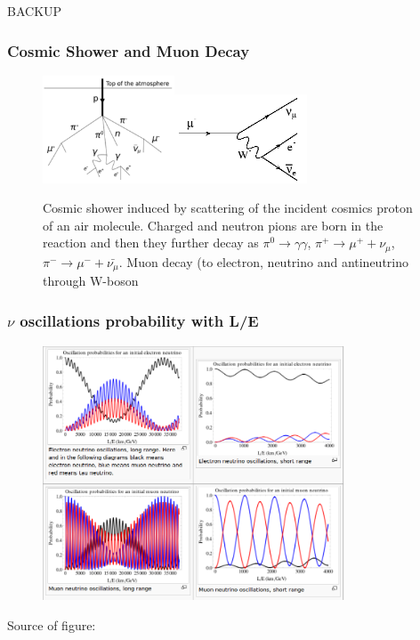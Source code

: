 \begin{frame}
\huge
\begin{center}
BACKUP
\end{center}
\end{frame}

\begin{frame}\frametitle{Cosmic Shower and Muon Decay}
\begin{figure}
\caption{Cosmic shower induced by scattering of the incident cosmics proton of an air molecule. Charged and neutron pions are born in the reaction and then they further decay as $\pi^0 \rightarrow \gamma\gamma$, $\pi^+ \rightarrow \mu^+ + \nu_\mu$, $\pi^- \rightarrow \mu^- + \bar{\nu_\mu}$. Muon decay (to electron, neutrino and antineutrino through W-boson}
\label{fig:cosmicMuons}
\centering
\includegraphics[width=0.35\textwidth, keepaspectratio=true]{figs/cosmicMuons.png}\includegraphics[width=0.35\textwidth, keepaspectratio=true]{figs/MuonDecay.png}
\end{figure}
\end{frame}

\begin{frame}\frametitle{$\nu$ oscillations probability with L/E}
\begin{figure}
\centering
\includegraphics[width=0.80\textwidth, keepaspectratio=true]{figs/oscProbability_with_LtoE.png}
\end{figure}
\tiny
Source of figure: \cite{ref_fig_oscProbability_with_LtoE}
\end{frame}

